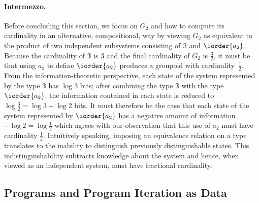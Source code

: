 
\paragraph{Intermezzo.} Before concluding this section, we focus on
$G_2$ and how to compute its cardinality in an alternative,
compositional, way by viewing $G_2$ as equivalent to the product of
two independent subsystems consisting of $\mathbb{3}$ and
$\iorder{a_2}$.  Because the cardinality of $\mathbb{3}$ is 3 and the
final cardinality of $G_2$ is $\frac{3}{2}$, it must be that using
$a_2$ to define $\iorder{a_2}$ produces a groupoid with
cardinality~$\frac{1}{2}$. From the information-theoretic perspective,
each state of the system represented by the type $\mathbb{3}$ has
$\log 3$ bits; after combining the type $\mathbb{3}$ with the type
$\iorder{a_2}$, the information contained in each state is reduced to
$\log \frac{3}{2} = \log 3 - \log 2$ bits. It must therefore be the
case that each state of the system represented by $\iorder{a_2}$ has a
negative amount of information $- \log 2 = \log \frac{1}{2}$ which
agrees with our observation that this use of $a_2$ must have
cardinality $\frac{1}{2}$. Intuitively speaking, imposing an
equivalence relation on a type translates to the inability to
distinguish previously distinguishable states. This
indistinguishability subtracts knowledge about the system and hence,
when viewed as an independent system, must have fractional
cardinality.

\subsection{Programs and Program Iteration as Data}
   

